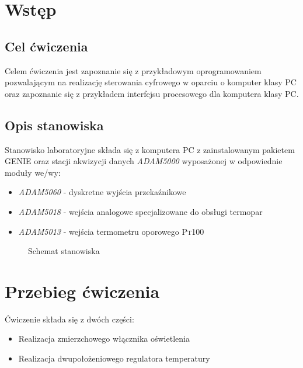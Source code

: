 \documentclass[12pt]{article}
\begin{document}


\section{Wstęp}

\subsection{Cel ćwiczenia}

Celem ćwiczenia jest zapoznanie się z przykładowym oprogramowaniem pozwalającym
na realizację sterowania cyfrowego w oparciu o komputer klasy PC oraz
zapoznanie się z przykładem interfejsu procesowego dla komputera klasy PC. 

\subsection{Opis stanowiska} 
Stanowisko laboratoryjne składa się z komputera PC z zainstalowanym pakietem
\textsc{GENIE} oraz stacji akwizycji danych \textit{ADAM5000} wyposażonej w
odpowiednie moduły we/wy:

\begin{itemize}
  \item \textit{ADAM5060} - dyskretne wyjścia przekaźnikowe
  \item \textit{ADAM5018} - wejścia analogowe specjalizowane do obsługi termopar
  \item \textit{ADAM5013} - wejścia termometru oporowego \textsc{Pt100}
\end{itemize}

\begin{figure}[!htb]
	\begin{center}
		
	\end{center}
	\caption{Schemat stanowiska}
\end{figure}

\newpage

\section{Przebieg ćwiczenia}

Ćwiczenie składa się z dwóch części:

\begin{itemize}
  \item Realizacja zmierzchowego włącznika oświetlenia
  \item Realizacja dwupołożeniowego regulatora temperatury
\end{itemize}
\end{document}
